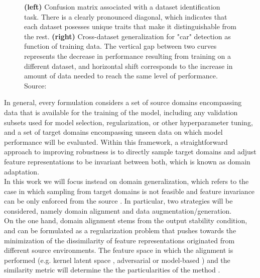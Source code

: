 \begin{figure}[H]
\begin{subfigure}[b]{0.32\textwidth}
    \end{subfigure}
       \caption{
        \textbf{(left)} Confusion matrix associated with a dataset
        identification task. There is a clearly pronounced diagonal,
        which indicates that each dataset posesses unique traits that
        make it distinguishable from the rest.
        \textbf{(right)} Cross-dataset generalization
        for "car" detection as function of training data. The vertical 
        gap between two curves represents the decrease in performance 
        resulting from training on a different dataset, and horizontal 
        shift corresponds to the increase in amount of data needed 
        to reach the same level of performance.
        Source: \cite{torralbaUnbiasedLookDataset2011}}
       \label{fig:dataset_bias}
\end{figure}

In general, every formulation considers a set of source domains 
encompassing data that is available for the training of the model,
including any validation subsets used for model selection, 
regularization, or other hyperparameter tuning, and a set of target 
domains encompassing unseen data on which model performance will
be evaluated. Within this framework, a straightforward approach
to improving robustness is to directly sample target domains
and adjust feature representations to be invariant 
between both, which is known as domain adaptation. \\

In this work we will focus instead on domain generalization, which 
refers to the case in which sampling from target domains is 
not feasible and feature invariance can be only enforced 
from the source
\cite{blanchardGeneralizingSeveralRelated}. In particular, two strategies will be considered, 
namely domain alignment and data augmentation/generation. \\

On the one hand, domain alignment stems from the output stability condition, and can be 
formulated as a regularization problem that pushes towards the 
minimization of the dissimilarity of feature  representations originated 
from different source environments. The feature space in which the 
alignment is performed (e.g. kernel latent space 
\cite{muandetDomainGeneralizationInvariant2013}, 
adversarial
\cite{peiMultiAdversarialDomainAdaptation}
or model-based
\cite{arjovskyInvariantRiskMinimization2020}) 
and the similarity metric will
determine the the particularities of the method
\cite{shenWassersteinDistanceGuided2018,liangComprehensiveSurveyTestTime2023}.

